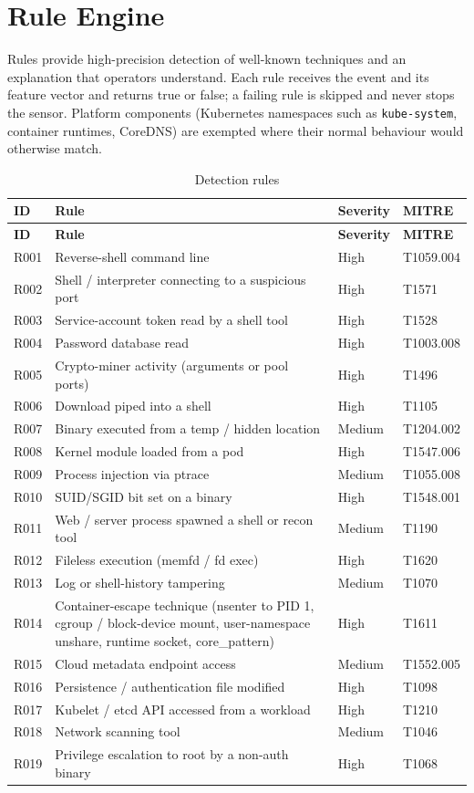 \section{Rule Engine}

Rules provide high-precision detection of well-known techniques and an explanation
that operators understand. Each rule receives the event and its feature vector and
returns true or false; a failing rule is skipped and never stops the sensor. Platform
components (Kubernetes namespaces such as \texttt{kube-system}, container runtimes,
CoreDNS) are exempted where their normal behaviour would otherwise match.

\begin{longtable}{p{1.0cm} p{6.6cm} p{1.5cm} p{2.2cm}}
\caption{Detection rules}\label{tab:rules}\\
\toprule
\textbf{ID} & \textbf{Rule} & \textbf{Severity} & \textbf{MITRE} \\
\midrule
\endfirsthead
\toprule
\textbf{ID} & \textbf{Rule} & \textbf{Severity} & \textbf{MITRE} \\
\midrule
\endhead
R001 & Reverse-shell command line & High & T1059.004 \\
R002 & Shell / interpreter connecting to a suspicious port & High & T1571 \\
R003 & Service-account token read by a shell tool & High & T1528 \\
R004 & Password database read & High & T1003.008 \\
R005 & Crypto-miner activity (arguments or pool ports) & High & T1496 \\
R006 & Download piped into a shell & High & T1105 \\
R007 & Binary executed from a temp / hidden location & Medium & T1204.002 \\
R008 & Kernel module loaded from a pod & High & T1547.006 \\
R009 & Process injection via ptrace & Medium & T1055.008 \\
R010 & SUID/SGID bit set on a binary & High & T1548.001 \\
R011 & Web / server process spawned a shell or recon tool & Medium & T1190 \\
R012 & Fileless execution (memfd / fd exec) & High & T1620 \\
R013 & Log or shell-history tampering & Medium & T1070 \\
R014 & Container-escape technique (nsenter to PID 1, cgroup / block-device mount, user-namespace unshare, runtime socket, core\_pattern) & High & T1611 \\
R015 & Cloud metadata endpoint access & Medium & T1552.005 \\
R016 & Persistence / authentication file modified & High & T1098 \\
R017 & Kubelet / etcd API accessed from a workload & High & T1210 \\
R018 & Network scanning tool & Medium & T1046 \\
R019 & Privilege escalation to root by a non-auth binary & High & T1068 \\
\bottomrule
\end{longtable}

